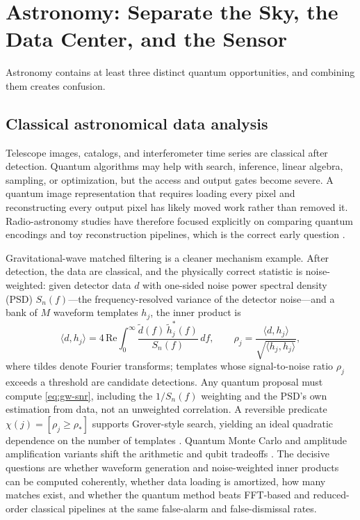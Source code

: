 \section{Astronomy: Separate the Sky, the Data Center, and the Sensor}\label{sec:astro}

Astronomy contains at least three distinct quantum opportunities, and combining them creates confusion.

\subsection{Classical astronomical data analysis}

Telescope images, catalogs, and interferometer time series are classical after detection. Quantum algorithms may help with search, inference, linear algebra, sampling, or optimization, but the access and output gates become severe. A quantum image representation that requires loading every pixel and reconstructing every output pixel has likely moved work rather than removed it. Radio-astronomy studies have therefore focused explicitly on comparing quantum encodings and toy reconstruction pipelines, which is the correct early question \citep{brunet2023}.

Gravitational-wave matched filtering is a cleaner mechanism example. After detection, the data are classical, and the physically correct statistic is noise-weighted: given detector data $d$ with one-sided noise power spectral density (PSD) $S_n(f)$---the frequency-resolved variance of the detector noise---and a bank of $M$ waveform templates $h_j$, the inner product is
\begin{equation}
\langle d,h_j\rangle
=4\,\mathrm{Re}\!\int_{0}^{\infty}
\frac{\tilde{d}(f)\,\tilde{h}_j^{*}(f)}{S_n(f)}\,df,
\qquad
\rho_j=\frac{\langle d,h_j\rangle}{\sqrt{\langle h_j,h_j\rangle}},
\label{eq:gw-snr}
\end{equation}
where tildes denote Fourier transforms; templates whose signal-to-noise ratio $\rho_j$ exceeds a threshold are candidate detections. Any quantum proposal must compute \cref{eq:gw-snr}, including the $1/S_n(f)$ weighting and the PSD's own estimation from data, not an unweighted correlation. A reversible predicate $\chi(j)=[\rho_j\geq\rho_*]$ supports Grover-style search, yielding an ideal quadratic dependence on the number of templates \citep{gao2022}. Quantum Monte Carlo and amplitude amplification variants shift the arithmetic and qubit tradeoffs \citep{miyamoto2022}. The decisive questions are whether waveform generation and noise-weighted inner products can be computed coherently, whether data loading is amortized, how many matches exist, and whether the quantum method beats FFT-based and reduced-order classical pipelines at the same false-alarm and false-dismissal rates.

